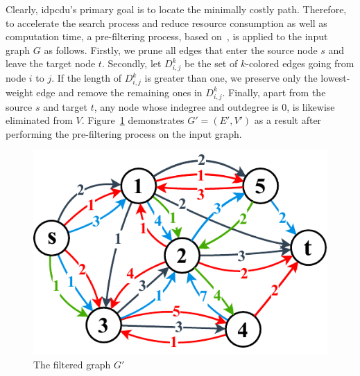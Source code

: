Clearly, \gls{idpcdu}'s primary goal is to locate the minimally costly path. Therefore, to accelerate the search process and reduce resource consumption as well as computation time, a pre-filtering process, based on~\cite{binh2021two}, is applied to the input graph $G$ as follows. Firstly, we prune all edges that enter the source node $s$ and leave the target node $t$. Secondly, let $D^k_{i,j}$ be the set of $k$-colored edges going from node $i$ to $j$. If the length of $D^k_{i,j}$ is greater than one, we preserve only the lowest-weight edge and remove the remaining ones in $D^k_{i,j}$. Finally, apart from the source $s$ and target $t$, any node whose indegree and outdegree is 0, is likewise eliminated from $V$. Figure~\ref{fig:filtered_graph} demonstrates $G'=(E', V')$ as a result after performing the pre-filtering process on the input graph.

\setlength{\intextsep}{3pt}
\renewcommand{\scalefigure}{0.8}
\begin{figure}[htbp]
	\centering
	\includegraphics[scale=\scalefigure]{Figures/chap 3/Bold Filtered Graph.pdf}
	\caption{The filtered graph $G'$}
	\label{fig:filtered_graph}
\end{figure}